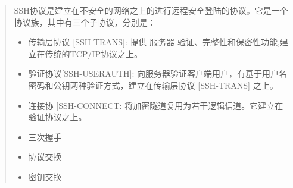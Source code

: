 \documentclass[a4paper,10pt,english]{sphinxmanual}
\begin{document}
\label{\detokenize{linux/shell:ssh}}\begin{quote}

SSH协议是建立在不安全的网络之上的进行远程安全登陆的协议。它是一个协议族，其中有三个子协议，分别是：
\begin{itemize}
\item {} 
传输层协议 {[}SSH-TRANS{]}: 提供 服务器 验证、完整性和保密性功能,建立在传统的TCP/IP协议之上。

\item {} 
验证协议{[}SSH-USERAUTH{]}: 向服务器验证客户端用户，有基于用户名密码和公钥两种验证方式，建立在传输层协议 {[}SSH-TRANS{]} 之上。

\item {} 
连接协    {[}SSH-CONNECT: 将加密隧道复用为若干逻辑信道。它建立在验证协议之上。

\end{itemize}
\begin{quote}

\noindent{}
\end{quote}

\begin{quote}

\noindent{}
\end{quote}
\begin{itemize}
\item {} 
三次握手

\end{itemize}
\begin{quote}

\noindent{}
\end{quote}
\begin{itemize}
\item {} 
协议交换

\end{itemize}
\begin{quote}

\noindent{}
\end{quote}
\begin{itemize}
\item {} 
密钥交换

\end{itemize}
\begin{quote}

\noindent{}
\end{quote}
\end{quote}
\end{document}
